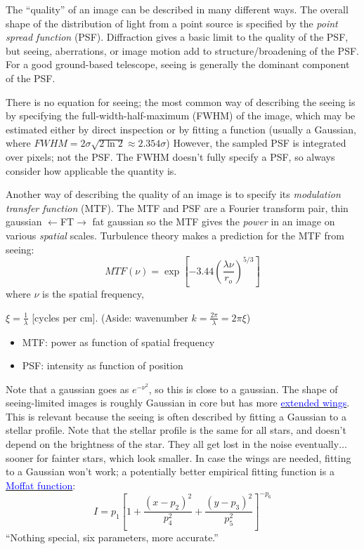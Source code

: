 \documentclass[12pt]{article}
\begin{document}
The ``quality'' of an image can be described in many different ways.
The overall shape of the distribution of light from a point source is
specified by the \emph{point spread function} (PSF). Diffraction gives a basic
limit to the quality of the PSF, but seeing, aberrations, or image
motion add to structure/broadening of the PSF\@. For a good ground-based
telescope, seeing is generally the dominant component of the PSF.

There is no equation for seeing;
the most common way of describing the seeing is by specifying
the full-width-half-maximum (FWHM) of the image, which may be
estimated either by direct inspection or by fitting a function
(usually a Gaussian, where $FWHM = 2\sigma\sqrt{2\ln{2}} \approx 2.354\sigma$)
However, the sampled PSF is integrated over pixels;
not the PSF\@. The FWHM doesn't fully specify a PSF,
so always consider how applicable the quantity is.

Another way of describing the quality of an image is to specify its
\emph{modulation transfer function} (MTF). The MTF and PSF are a Fourier
transform pair,
\textcolor{myBlue}
{thin gaussian $\leftarrow$\small FT\normalsize$\rightarrow$ fat gaussian}
so the MTF gives the \emph{power} in an image on various
\emph{spatial} scales. Turbulence theory makes a prediction for the MTF from
seeing:
    $$ MTF(\nu) = \exp\left[-3.44\left(\frac{\lambda\nu}{r_o}\right)
    ^{5/3}\right] $$
where $\nu$ is the spatial frequency,
\textcolor{myBlue}{$\xi = \frac{1}{\lambda}$ [cycles per cm].
(Aside: wavenumber $k = \frac{2\pi}{\lambda} = 2\pi\xi$)
\begin{itemize}
    \item MTF: power as function of spatial frequency
    \item PSF: intensity as function of position
\end{itemize}}

Note that a gaussian goes as $e^{-\nu^2}$, so this is close to a gaussian.
The shape of seeing-limited images is roughly Gaussian in core but has more
\href{http://astronomy.nmsu.edu/holtz/a535/html/diagrams/a535/racine2.htm}
{\textcolor{blue}{extended wings}}.
This is relevant because the seeing
is often described by fitting a Gaussian to a stellar profile.
\textcolor{myBlue}{Note that the stellar profile is the same for all
stars, and doesn't depend on the brightness of the star.
They all get lost in the noise eventually$\ldots$ sooner for fainter
stars, which look smaller.
In case the wings are needed, fitting to a Gaussian won't work;}
a potentially better empirical fitting function is a
\href{http://astronomy.nmsu.edu/holtz/a535/html/diagrams/a535/racine3.htm}
{\textcolor{blue}{Moffat function}}:
    $$  I=p_1\left[
    1+\frac{\left(x-p_2\right)^2}{p_4^2} +
      \frac{\left(y-p_3\right)^2}{p_5^2}\right]^{-p_6} $$
``Nothing special, six parameters, more accurate.''
\end{document}

